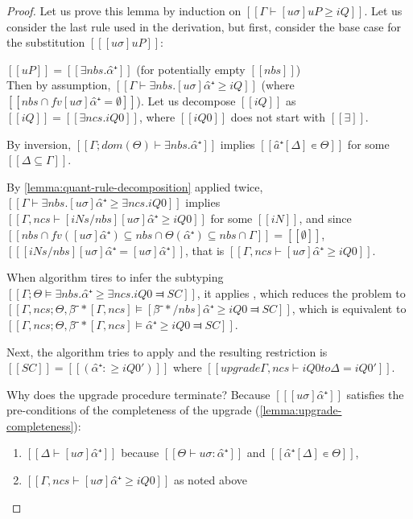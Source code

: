 \lemPosSubtCompleteness*
\begin{proof}
    Let us prove this lemma by induction on $[[ Γ ⊢ [uσ]uP ≥ iQ ]]$.
    Let us consider the last rule used in the derivation,
    but first, consider the base case for the substitution $[[ [uσ]uP ]]$:
    \begin{caseof}
        \item \label{case:pos-subt-complete-base} $[[uP]] = [[ ∃nbs.α̂⁺ ]]$ 
            (for potentially empty $[[nbs]]$)\\
            Then by assumption, $[[ Γ ⊢ ∃nbs.[uσ]α̂⁺ ≥ iQ ]]$ (where $[[ {nbs} ∩ fv [uσ]α̂⁺ = ∅]]$).
            Let us decompose $[[iQ]]$ as $[[iQ]] = [[∃ncs.iQ0]]$, where $[[iQ0]]$ does
            not start with $[[∃]]$. 

            By inversion, $[[Γ ; dom(Θ) ⊢  ∃nbs.α̂⁺]]$ implies $[[â⁺[Δ] ∊ Θ]]$ for some 
            $[[{Δ} ⊆ Γ]]$.

            By \cref{lemma:quant-rule-decomposition} applied twice, 
            $[[ Γ ⊢ ∃nbs.[uσ]α̂⁺ ≥ ∃ncs.iQ0 ]]$ implies
            $[[ Γ,ncs  ⊢ [iNs/nbs][uσ]α̂⁺ ≥ iQ0 ]]$ for some $[[iN]]$, 
            and since $[[ {nbs} ∩ fv([uσ]α̂⁺) ⊆ {nbs} ∩ {Θ(α̂⁺)} ⊆ {nbs} ∩ Γ]] = [[ ∅ ]]$,
            $[[ [iNs/nbs][uσ]α̂⁺ = [uσ]α̂⁺ ]]$, that is $[[ Γ,ncs ⊢ [uσ]α̂⁺ ≥ iQ0]]$.

            When algorithm tires to infer the subtyping 
            $[[Γ; Θ ⊨ ∃nbs.α̂⁺ ≥ ∃ncs.iQ0 ⫤ SC]]$,
            it applies ,
            which reduces the problem to
            $[[Γ, ncs; Θ, β̂⁻*[Γ, ncs] ⊨ [β̂⁻*/nbs] α̂⁺ ≥ iQ0 ⫤ SC]]$, 
            which is equivalent to 
            $[[Γ, ncs; Θ, β̂⁻*[Γ, ncs] ⊨ α̂⁺ ≥ iQ0 ⫤ SC]]$.

            Next, the algorithm tries to apply
            and the resulting restriction is $[[SC]] = [[(α̂⁺ :≥ iQ0')]]$ where
            $[[upgrade Γ, ncs ⊢ iQ0 to Δ = iQ0']]$.

            Why does the upgrade procedure terminate?
            Because $[[ [uσ]α̂⁺ ]]$ satisfies the pre-conditions of the completeness of the upgrade
            (\cref{lemma:upgrade-completeness}):
            \begin{enumerate}
                \item $[[Δ ⊢ [uσ]α̂⁺ ]]$ because $[[Θ ⊢ uσ : {α̂⁺}]]$ and $[[α̂⁺[Δ] ∊ Θ]]$,
                \item $[[ Γ,ncs ⊢ [uσ]α̂⁺ ≥ iQ0]]$ as noted above
            \end{enumerate}


\end{caseof}
\end{proof}
